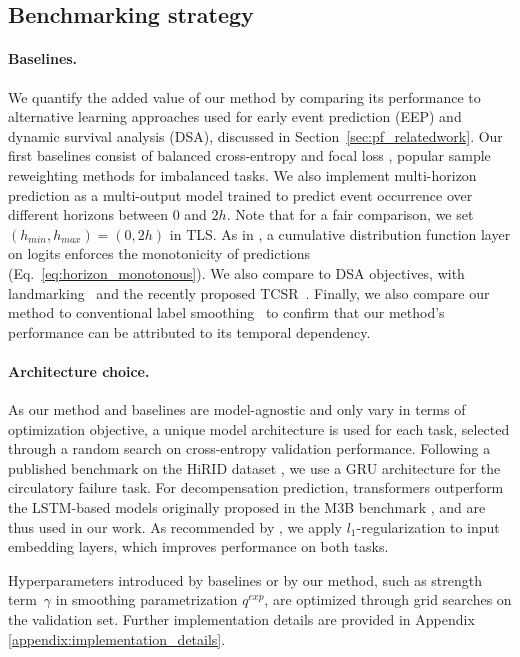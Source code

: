 \documentclass[nohyperref]{article}
\begin{document}
\subsection{Benchmarking strategy}
\paragraph{Baselines.} We quantify the added value of our method by comparing its performance to alternative learning approaches used for early event prediction (EEP) and dynamic survival analysis (DSA), discussed in Section~\ref{sec:pf_relatedwork}. 
Our first baselines consist of {balanced cross-entropy} \citep{king2001logistic} and {focal loss} \citep{lin2017}, popular sample reweighting methods for imbalanced tasks.
We also implement {multi-horizon prediction} as a multi-output model trained to predict event occurrence over different horizons between $0$ and $2h$. Note that for a fair comparison, we set $(h_{min},h_{max})=(0,2h)$ in TLS. As in \citet{tomavsev2019}, a cumulative distribution function layer on logits enforces the monotonicity of predictions (Eq.~\ref{eq:horizon_monotonous}). We also compare to DSA objectives, with landmarking~\citep{van2007dynamic} and the recently proposed TCSR~\citep{Maystre2022}.
Finally, we also compare our method to conventional label smoothing~\citep{DBLP:conf/cvpr/SzegedyVISW16} to confirm that our method's performance can be attributed to its temporal dependency.

\paragraph{Architecture choice.} As our method and baselines are model-agnostic and only vary in terms of optimization objective, a unique model architecture is used for each task, selected through a random search on cross-entropy validation performance. Following a published benchmark on the HiRID dataset \citep{yeche2021}, we use a GRU \citep{DBLP:journals/corr/ChungGCB14} architecture for the {circulatory failure} task. For {decompensation} prediction, transformers \citep{DBLP:conf/nips/VaswaniSPUJGKP17} outperform the LSTM-based models \citep{hochreiter1997long} originally proposed in the M3B benchmark \citep{harutyunyan2019multitask}, and are thus used in our work. As recommended by \citet{tomavsev2019}, we apply $l_1$-regularization to input embedding layers, which improves performance on both tasks. 

Hyperparameters introduced by baselines or by our method, such as strength term~$\gamma$ in smoothing parametrization $q^{exp}$, are optimized through grid searches on the validation set. Further implementation details are provided in Appendix \ref{appendix:implementation_details}.
\end{document}
